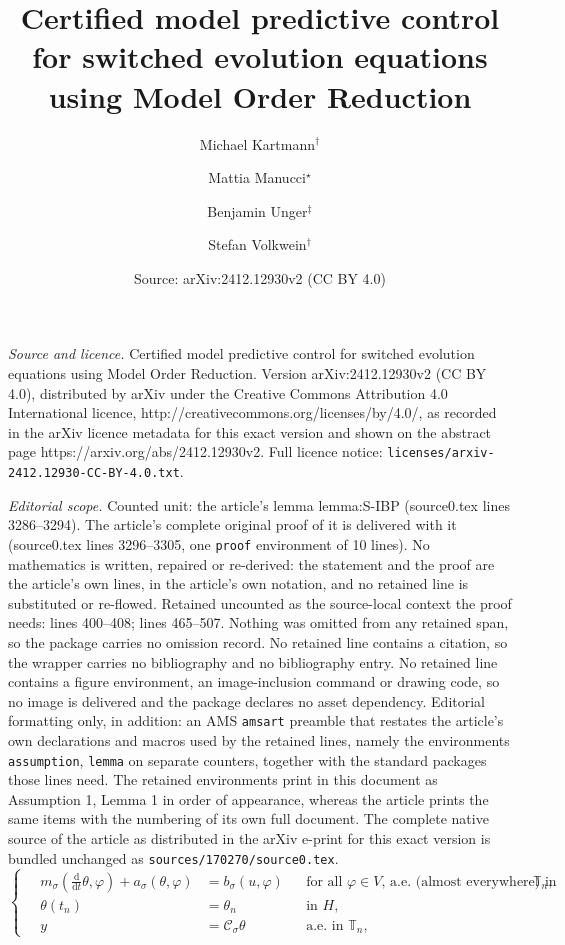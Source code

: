 \documentclass[10pt,a4paper]{amsart}
\title{Certified model predictive control for switched evolution equations using Model Order Reduction}
\author{Michael Kartmann${}^{\dagger}$ \and Mattia Manucci${}^\star$ \and Benjamin Unger${}^\ddagger$ \and Stefan Volkwein${}^\dagger$}
\date{Source: arXiv:2412.12930v2 (CC BY 4.0)}
\newcommand{\cOper}{\calC}
\newcommand{\calC}{\mathcal{C}}
\newcommand{\ddt}{\tfrac{\mathrm{d}}{\mathrm{d}t}}
\newcommand{\inpVar}{u}
\newcommand{\outVar}{y}
\newcommand{\state}{\theta}
\newcommand{\switch}{\sigma}
\newcommand{\timeInt}{\mathbb{T}}
\begin{document}
\maketitle

\noindent\emph{Source and licence.} Certified model predictive control for switched evolution equations using Model Order Reduction. Version arXiv:2412.12930v2 (CC BY 4.0), distributed by arXiv under the Creative Commons Attribution 4.0 International licence, http://creativecommons.org/licenses/by/4.0/, as recorded in the arXiv licence metadata for this exact version and shown on the abstract page https://arxiv.org/abs/2412.12930v2. Full licence notice: \texttt{licenses/arxiv-2412.12930-CC-BY-4.0.txt}.\par\smallskip

\noindent\textit{Editorial scope.} Counted unit: the article's lemma lemma:S-IBP (source0.tex lines 3286--3294). The article's complete original proof of it is delivered with it (source0.tex lines 3296--3305, one \texttt{proof} environment of 10 lines). No mathematics is written, repaired or re-derived: the statement and the proof are the article's own lines, in the article's own notation, and no retained line is substituted or re-flowed.  Retained uncounted as the source-local context the proof needs: lines 400--408; lines 465--507.  Nothing was omitted from any retained span, so the package carries no omission record.  No retained line contains a citation, so the wrapper carries no bibliography and no bibliography entry.  No retained line contains a figure environment, an image-inclusion command or drawing code, so no image is delivered and the package declares no asset dependency.  Editorial formatting only, in addition: an AMS \texttt{amsart} preamble that restates the article's own declarations and macros used by the retained lines, namely the environments \texttt{assumption}, \texttt{lemma} on separate counters, together with the standard packages those lines need.  The retained environments print in this document as Assumption 1, Lemma 1 in order of appearance, whereas the article prints the same items with the numbering of its own full document.  The complete native source of the article as distributed in the arXiv e-print for this exact version is bundled unchanged as \texttt{sources/170270/source0.tex}.
\begin{equation}
    \label{eqn:weakForm} %
    \left\{\quad
    \begin{aligned}
        m_{\switch}(\ddt \state,\varphi) + a_{\switch}(\state,\varphi) &= b_{\switch}(\inpVar,\varphi) && \text{for all $\varphi\in V$, a.e. (almost everywhere) in }\timeInt_n,\\
       \state(t_n) &= \state_{n} && \text{in } H,\\
       \outVar &= \cOper_{\switch}\state && \text{a.e. in }\timeInt_n, %
    \end{aligned}\right.
\end{equation}
\end{document}
